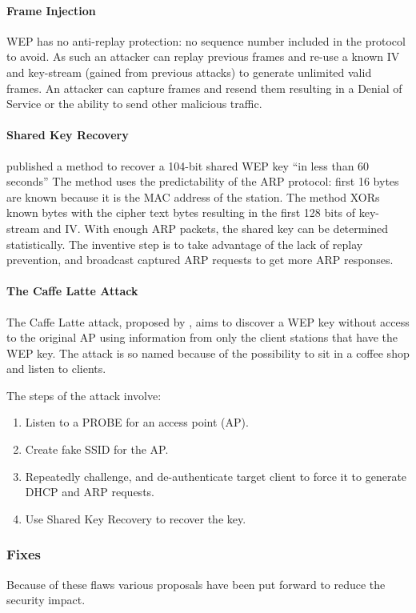 \documentclass[pdftex, 11pt, a4paper]{article}
\begin{document}
\paragraph{Frame Injection}
WEP has no anti-replay protection: no sequence number included in the protocol to avoid. As such an attacker can replay previous frames and re-use a known IV and key-stream (gained from previous attacks) to generate unlimited valid frames.  An attacker can capture frames and resend them resulting in a Denial of Service or the ability to send other malicious traffic.

\paragraph{Shared Key Recovery}
\textcite{tews2007breaking} published a method to recover a 104-bit shared WEP key ``in less than 60 seconds''  The method uses the predictability of the ARP protocol: first 16 bytes are known because it is the MAC address of the station.
The method XORs known bytes with the cipher text bytes resulting in the first 128 bits of key-stream and IV. With enough ARP packets, the shared key can be determined statistically.
The inventive step is to take advantage of the lack of replay prevention, and broadcast captured ARP requests to get more ARP responses.

\paragraph{The Caffe Latte Attack}
The Caffe Latte attack, proposed by \textcite{cafe}, aims to discover a WEP key without access to the original AP using information from only the client stations that have the WEP key. The attack is so named because of the possibility to sit in a coffee shop and listen to clients.

The steps of the attack involve:
\begin{enumerate}
    \item Listen to a PROBE for an access point (AP).
    \item Create fake SSID for the AP.
    \item Repeatedly challenge, and de-authenticate target client to force it to generate DHCP and ARP requests.
    \item Use Shared Key Recovery to recover the key.
\end{enumerate}

\subsubsection{Fixes}
Because of these flaws various proposals have been put forward to reduce the security impact.
\end{document}
